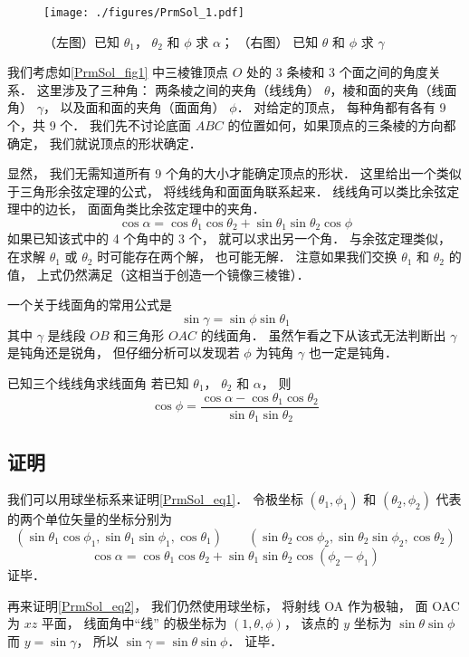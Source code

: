 


\begin{figure}[ht]
\centering
\texttt{[image: ./figures/PrmSol\_1.pdf]}
\caption{（左图）已知 $\theta_1$， $\theta_2$ 和 $\phi$ 求 $\alpha$； （右图） 已知 $\theta$ 和 $\phi$ 求 $\gamma$} \label{PrmSol_fig1}
\end{figure}

我们考虑如\autoref{PrmSol_fig1} 中三棱锥顶点 $O$ 处的 3 条棱和 3 个面之间的角度关系． 这里涉及了三种角： 两条棱之间的夹角（线线角） $\theta$，棱和面的夹角（线面角） $\gamma$， 以及面和面的夹角（面面角） $\phi$． 对给定的顶点， 每种角都有各有 9 个，共 9 个． 我们先不讨论底面 $ABC$ 的位置如何，如果顶点的三条棱的方向都确定， 我们就说顶点的形状确定．

显然， 我们无需知道所有 9 个角的大小才能确定顶点的形状． 这里给出一个类似于三角形余弦定理的公式， 将线线角和面面角联系起来． 线线角可以类比余弦定理中的边长， 面面角类比余弦定理中的夹角．
\begin{equation}\label{PrmSol_eq1}
\cos\alpha = \cos\theta_1 \cos\theta_2 + \sin\theta_1 \sin\theta_2 \cos\phi
\end{equation}
如果已知该式中的 4 个角中的 3 个， 就可以求出另一个角． 与余弦定理类似， 在求解 $\theta_1$ 或 $\theta_2$ 时可能存在两个解， 也可能无解． 注意如果我们交换 $\theta_1$ 和 $\theta_2$ 的值， 上式仍然满足（这相当于创造一个镜像三棱锥）．

一个关于线面角的常用公式是
\begin{equation}\label{PrmSol_eq2}
\sin\gamma = \sin\phi\sin\theta_1
\end{equation}
其中 $\gamma$ 是线段 $OB$ 和三角形 $OAC$ 的线面角． 虽然乍看之下从该式无法判断出 $\gamma$ 是钝角还是锐角， 但仔细分析可以发现若 $\phi$ 为钝角 $\gamma$ 也一定是钝角．

\begin{example}{已知三个线线角求线面角}
若已知 $\theta_1$， $\theta_2$ 和 $\alpha$， 则
\begin{equation}
\cos\phi = \frac{\cos\alpha - \cos\theta_1 \cos\theta_2}{\sin\theta_1 \sin\theta_2}
\end{equation}
\end{example}

\subsection{证明}
我们可以用球坐标系来证明\autoref{PrmSol_eq1}． 令极坐标 $(\theta_1, \phi_1)$ 和 $(\theta_2, \phi_2)$ 代表的两个单位矢量的坐标分别为
\begin{equation}
(\sin\theta_1\cos\phi_1, \sin\theta_1\sin\phi_1, \cos\theta_1)
\qquad
(\sin\theta_2\cos\phi_2, \sin\theta_2\sin\phi_2, \cos\theta_2)
\end{equation}
\begin{equation}
\cos\alpha = \cos\theta_1 \cos\theta_2 + \sin\theta_1 \sin\theta_2 \cos(\phi_2 - \phi_1)
\end{equation}
证毕．

再来证明\autoref{PrmSol_eq2}， 我们仍然使用球坐标， 将射线 OA 作为极轴， 面 OAC 为 $xz$ 平面， 线面角中“线” 的极坐标为 $(1, \theta, \phi)$， 该点的 $y$ 坐标为 $\sin\theta \sin\phi$ 而 $y = \sin\gamma$， 所以 $\sin\gamma = \sin\theta \sin\phi$． 证毕．